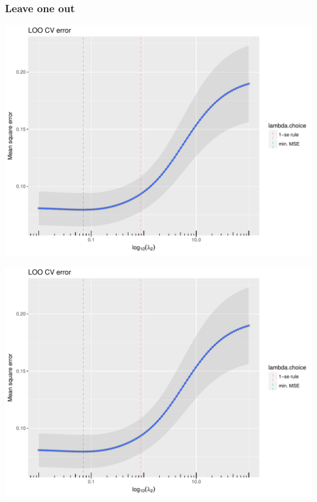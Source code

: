 \documentclass[10pt, c, xcolor=x11names]{beamer}\usepackage[]{graphicx}\usepackage[]{color}
\newenvironment{knitrout}{}{} %
\begin{document}
\begin{frame}[containsverbatim]
  \frametitle{Leave one out}
\begin{knitrout}\scriptsize
{}\color{fgcolor}
\includegraphics[width=.8\textwidth]{figures/ridgeplot_loo_ridge-1} 

\includegraphics[width=.8\textwidth]{figures/ridgeplot_loo_ridge-2} 

\end{knitrout}
\end{frame}
\end{document}
